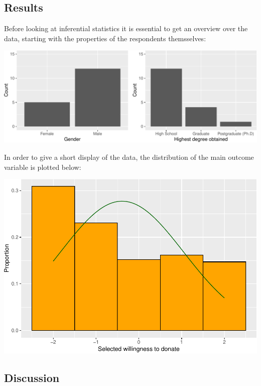 \documentclass[12pt,]{article}
\begin{document}
\hypertarget{results}{%
\subsection{Results}\label{results}}

Before looking at inferential statistics it is essential to get an
overview over the data, starting with the properties of the respondents
themsselves:

\includegraphics[width=1.05\linewidth]{FSE_paper_files/figure-latex/unnamed-chunk-2-1}

In order to give a short display of the data, the distribution of the
main outcome variable is plotted below:

\includegraphics{FSE_paper_files/figure-latex/plotting_proportions-1.pdf}

\hypertarget{discussion}{%
\subsection{Discussion}\label{discussion}}
\end{document}
